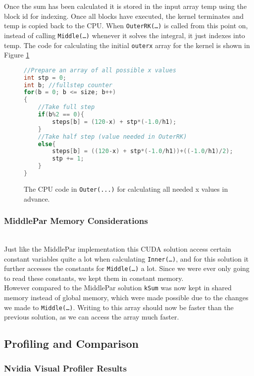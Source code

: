 Once the sum has been calculated it is stored in the input array temp using the block id for indexing. Once all blocks have executed, the kernel terminates and temp is copied back to the CPU. When \texttt{OuterRK(…)} is called from this point on, instead of calling \texttt{Middle(…)} whenever it solves the integral, it just indexes into temp. The code for calculating the initial \texttt{outerx} array for the kernel is shown in Figure \ref{fig:outerparcpu}

\begin{figure}[ht]
\begin{lstlisting}[language=c]
//Prepare an array of all possible x values
int stp = 0;
int b; //fullstep counter
for(b = 0; b <= size; b++)
{
	//Take full step
	if(b%2 == 0){
		steps[b] = (120-x) + stp*(-1.0/h1);
	}
	//Take half step (value needed in OuterRK)
	else{
		steps[b] = ((120-x) + stp*(-1.0/h1))+((-1.0/h1)/2);
		stp += 1;
	}
}
\end{lstlisting}
\caption{The CPU code in \texttt{Outer(...)} for calculating all needed x values in advance.}
\label{fig:outerparcpu}
\end{figure}

\subsubsection{MiddlePar Memory Considerations} \hfill \\
Just like the MiddlePar implementation this CUDA solution access certain constant variables quite a lot when calculating \texttt{Inner(…)}, and for this solution it further accesses the constants for \texttt{Middle(…)} a lot. Since we were ever only going to read these constants, we kept them in constant memory.\\

However compared to the MiddlePar solution \texttt{kSum} was now kept in shared memory instead of global memory, which were made possible due to the changes we made to \texttt{Middle(…)}. Writing to this array should now be faster than the previous solution, as we can access the array much faster.

\subsection{Profiling and Comparison}
\subsubsection{Nvidia Visual Profiler Results} \hfill \\

